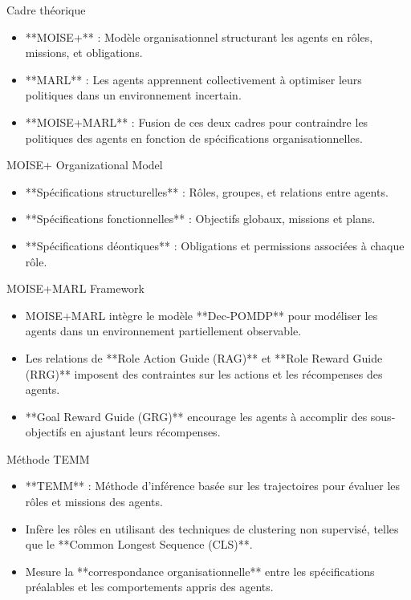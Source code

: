 \documentclass{beamer}
\begin{document}
\begin{frame}{Cadre théorique}
    \begin{itemize}
        \item **MOISE+** : Modèle organisationnel structurant les agents en rôles, missions, et obligations.
        \item **MARL** : Les agents apprennent collectivement à optimiser leurs politiques dans un environnement incertain.
        \item **MOISE+MARL** : Fusion de ces deux cadres pour contraindre les politiques des agents en fonction de spécifications organisationnelles.
    \end{itemize}
\end{frame}

\begin{frame}{MOISE+ Organizational Model}
    \begin{itemize}
        \item **Spécifications structurelles** : Rôles, groupes, et relations entre agents.
        \item **Spécifications fonctionnelles** : Objectifs globaux, missions et plans.
        \item **Spécifications déontiques** : Obligations et permissions associées à chaque rôle.
    \end{itemize}
\end{frame}

\begin{frame}{MOISE+MARL Framework}
    \begin{itemize}
        \item MOISE+MARL intègre le modèle **Dec-POMDP** pour modéliser les agents dans un environnement partiellement observable.
        \item Les relations de **Role Action Guide (RAG)** et **Role Reward Guide (RRG)** imposent des contraintes sur les actions et les récompenses des agents.
        \item **Goal Reward Guide (GRG)** encourage les agents à accomplir des sous-objectifs en ajustant leurs récompenses.
    \end{itemize}
\end{frame}

\begin{frame}{Méthode TEMM}
    \begin{itemize}
        \item **TEMM** : Méthode d'inférence basée sur les trajectoires pour évaluer les rôles et missions des agents.
        \item Infère les rôles en utilisant des techniques de clustering non supervisé, telles que le **Common Longest Sequence (CLS)**.
        \item Mesure la **correspondance organisationnelle** entre les spécifications préalables et les comportements appris des agents.
    \end{itemize}
\end{frame}
\end{document}
